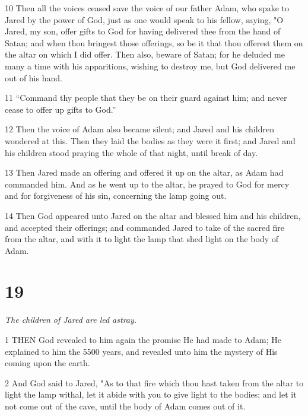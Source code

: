 \par 10 Then all the voices ceased save the voice of our father Adam, who spake to Jared by the power of God, just as one would speak to his fellow, saying, "O Jared, my son, offer gifts to God for having delivered thee from the hand of Satan; and when thou bringest those offerings, so be it that thou offerest them on the altar on which I did offer. Then also, beware of Satan; for he deluded me many a time with his apparitions, wishing to destroy me, but God delivered me out of his hand.

\par 11 “Command thy people that they be on their guard against him; and never cease to offer up gifts to God.”

\par 12 Then the voice of Adam also became silent; and Jared and his children wondered at this. Then they laid the bodies as they were it first; and Jared and his children stood praying the whole of that night, until break of day.

\par 13 Then Jared made an offering and offered it up on the altar, as Adam had commanded him. And as he went up to the altar, he prayed to God for mercy and for forgiveness of his sin, concerning the lamp going out.

\par 14 Then God appeared unto Jared on the altar and blessed him and his children, and accepted their offerings; and commanded Jared to take of the sacred fire from the altar, and with it to light the lamp that shed light on the body of Adam.

\chapter{19}

\par \textit{The children of Jared are led astray.}

\par 1 THEN God revealed to him again the promise He had made to Adam; He explained to him the 5500 years, and revealed unto him the mystery of His coming upon the earth.

\par 2 And God said to Jared, "As to that fire which thou hast taken from the altar to light the lamp withal, let it abide with you to give light to the bodies; and let it not come out of the cave, until the body of Adam comes out of it.

